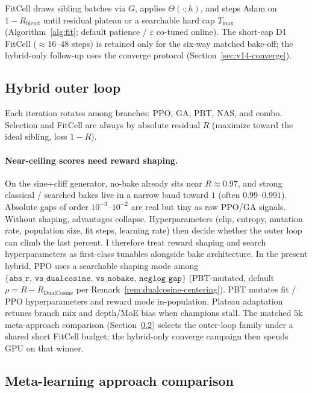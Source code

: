 FitCell draws sibling batches via $G$, applies $\Theta(\cdot;h)$, and steps Adam on $1-R_{\mathrm{blend}}$ until residual plateau or a searchable hard cap $T_{\max}$ (Algorithm~\ref{alg:fit}; default patience / $\varepsilon$ co-tuned online).
The short-cap D1 FitCell (${\approx}16$--$48$ steps) is retained only for the six-way matched bake-off; the hybrid-only follow-up uses the converge protocol (Section~\ref{sec:v14-converge}).

\subsection{Hybrid outer loop}
\label{sec:hybrid}

Each iteration rotates among branches: PPO, GA, PBT, NAS, and combo.
Selection and FitCell are always by absolute residual $R$ (maximize toward the ideal sibling, loss $1-R$).

\paragraph{Near-ceiling scores need reward shaping.}
\label{sec:reward-shaping}
On the sine{+}cliff generator, no-bake already sits near $R\approx 0.97$, and strong classical / searched bakes live in a narrow band toward $1$ (often $0.99$--$0.991$).
Absolute gaps of order $10^{-3}$--$10^{-2}$ are real but tiny as raw PPO/GA signals.
Without shaping, advantages collapse.
Hyperparameters (clip, entropy, mutation rate, population size, fit steps, learning rate) then decide whether the outer loop can climb the last percent.
I therefore treat reward shaping and search hyperparameters as first-class tunables alongside bake architecture.
In the present hybrid, PPO uses a searchable shaping mode among $\{\texttt{abs\_r},\,\texttt{vs\_dualcosine},\,\texttt{vs\_nobake},\,\texttt{neglog\_gap}\}$ (PBT-mutated, default $\rho = R - R_{\mathrm{DualCosine}}$ per Remark~\ref{rem:dualcosine-centering}).
PBT mutates fit / PPO hyperparameters and reward mode in-population. Plateau adaptation retunes branch mix and depth/MoE bias when champions stall.
The matched $5$k meta-approach comparison (Section~\ref{sec:meta-compare}) selects the outer-loop family under a shared short FitCell budget; the hybrid-only converge campaign then spends GPU on that winner.

\subsection{Meta-learning approach comparison}
\label{sec:meta-compare}


